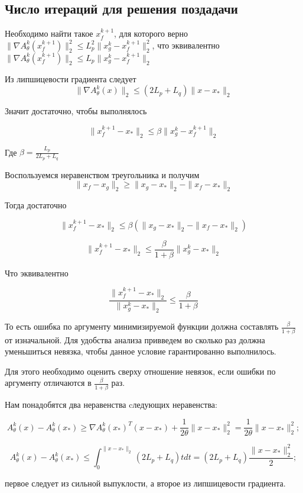 \documentclass[a4paper,12pt]{extarticle}
\newcommand{\norm}[1]{\|#1\|_{2}}
\newcommand{\sqn}[1]{\norm{#1}^2}
\begin{document}
\subsection{Число итераций для решения поздадачи}

Необходимо найти такое $x_f^{k + 1}$,
для которого верно $\sqn{\nabla A_{\theta}^k(x_f^{k+1})} \leq L_p^2 \sqn{x_g^k- x_f^{k+1}}$,
что эквивалентно $\norm{\nabla A_{\theta}^k(x_f^{k+1})} \leq L_p \norm{x_g^k- x_f^{k+1}}$

Из липшицевости градиента следует 
\[\norm{\nabla A_{\theta}^k(x)} \leq (2L_p + L_q)\norm{x - x_*}\]

Значит достаточно, чтобы выполнялось 

\[\norm{x_f^{k + 1} - x_*} \leq \beta \norm{x_g^k- x_f^{k+1}}\]

Где $\beta = \frac{L_p}{2L_p + L_q}$


Воспользуемся неравенством треугольника и получим
\[\norm{x_f - x_g} \geq \norm {x_g - x_*} - \norm{x_f - x_*}
\]


Тогда достаточно 

\[\norm{x_f^{k + 1} - x_*} \leq \beta (\norm {x_g - x_*} - \norm{x_f - x_*})\]

\[\norm{x_f^{k + 1} - x_*} \leq \frac{\beta}{1 + \beta} \norm{x_g^k- x_*}\]

Что эквивалентно

\[\frac{\norm{x_f^{k + 1} - x_*}}{\norm{x_g^k- x_*}} \leq \frac{\beta}{1 + \beta} \]

То есть ошибка по аргументу минимизируемой функции должна составлять $\frac{\beta}{1 + \beta}$ от изначальной. 
Для удобства анализа привведем во сколько раз должна уменьшиться невязка,
чтобы данное условие гарантированно выполнилось.

Для этого необходимо оценить сверху отношение невязок,
если ошибки по аргументу отличаются в $\frac{\beta}{1 + \beta}$ раз. 


Нам понадобятся два неравенства cледующих неравенства:


\[A_{\theta}^k(x) - A_{\theta}^k(x_*) \geq
\nabla A_{\theta}^k(x_*)^T(x-x_*) + \frac{1}{2\theta}\sqn{x-x_*} = 
\frac{1}{2\theta}\sqn{x-x_*}; \]




\[A_{\theta}^k(x) - A_{\theta}^k(x_*) \leq \int_{0}^{\norm{x-x_*}} (2L_p + L_q) t dt =
(2L_p + L_q) \frac{\sqn{x-x_*}}{2}; \]


первое следует из сильной выпуклости, а второе из липшицевости градиента. 
\end{document}
